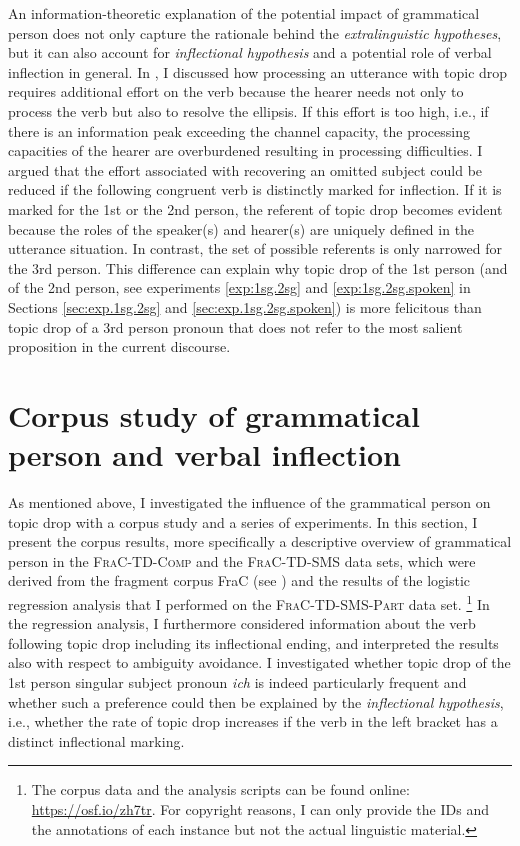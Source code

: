 An information-theoretic explanation of the potential impact of grammatical person does not only capture the rationale behind the \textit{extralinguistic hypotheses}, but it can also account for  \textit{inflectional hypothesis} and a potential role of verbal inflection in general.
In , I discussed how processing an utterance with topic drop requires additional effort  on the verb because the hearer needs not only to process the verb but also to resolve the ellipsis.
If this effort  is too high, i.e., if there is an information peak exceeding the channel capacity,  the processing capacities of the hearer are overburdened resulting in processing difficulties.
I argued that the effort  associated with recovering  an omitted subject could be reduced if the following congruent verb is distinctly marked for inflection.
If it is marked for the 1st or the 2nd person, the referent of topic drop becomes evident because the roles of the speaker(s) and hearer(s) are uniquely defined in the utterance situation.
In contrast, the set of possible referents is only narrowed for the 3rd person.
This difference can explain why topic drop of the 1st person (and of the 2nd person, see experiments \ref*{exp:1sg.2sg} and \ref*{exp:1sg.2sg.spoken} in Sections \ref{sec:exp.1sg.2sg} and \ref{sec:exp.1sg.2sg.spoken}) is more felicitous than topic drop of a 3rd person pronoun that does not refer to the most salient  proposition in the current discourse.

\largerpage
\section{Corpus study of grammatical person and verbal inflection }
\label{sec:factor.person.corpus}
As mentioned above, I investigated the influence of the grammatical person on topic drop with a corpus study and a series of experiments.
In this section, I present the corpus results, more specifically a descriptive overview of grammatical person in the \textsc{FraC-TD-Comp} and the \textsc{FraC-TD-SMS} data sets, which were derived from the fragment corpus FraC (see ) and the results of the logistic regression analysis that I performed on the \textsc{FraC-TD-SMS-Part} data set.%
\footnote{The corpus data and the analysis scripts can be found online: \url{https://osf.io/zh7tr}.
For copyright reasons, I can only provide the IDs and the annotations of each instance but not the actual linguistic material.}
%
In the regression analysis, I furthermore considered information about the verb following topic drop including its inflectional ending, and interpreted the results also with respect to ambiguity avoidance.
I investigated whether topic drop of the 1st person singular subject pronoun \textit{ich} is indeed particularly frequent and whether such a preference could then be explained by the \textit{inflectional hypothesis}, i.e., whether the rate of topic drop increases if the verb in the left bracket has a distinct inflectional marking.

